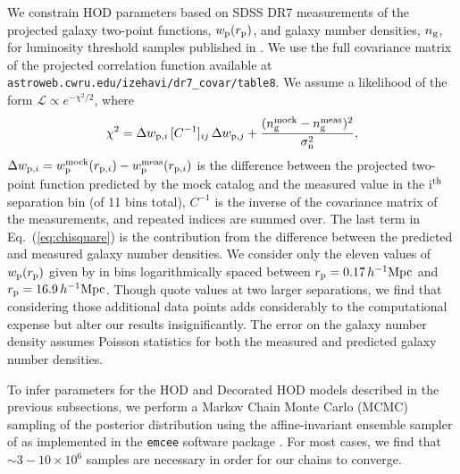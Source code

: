 \documentclass[usenatbib,usegraphicx,letterpaper]{mn2e}
\begin{document}
We constrain HOD parameters based on SDSS DR7 measurements of the projected
galaxy two-point functions, $w_{\rm p}(r_{\rm p})$, and galaxy number densities, $n_{\rm g}$,
for luminosity threshold samples published in \citet{zehavi_etal11}. We use the full covariance
matrix of the projected correlation function available at
{\tt astroweb.cwru.edu/izehavi/dr7\_covar/table8}. We assume a likelihood of the
form $\mathcal{L} \propto e^{-\chi^2/2}$, where
%
\begin{equation}
\label{eq:chisquare}
\chi^2 = \Delta w_{{\rm p},i} \, [C^{-1}]_{ij} \, \Delta w_{{\rm p},j} + \frac{(n_{\rm g}^{\rm mock} - n_{\rm g}^{\rm meas})^2}{\sigma_{\rm n}^2},
\end{equation}
%
$\Delta w_{{\rm p},i} = w_{\rm p}^{\rm mock}(r_{{\rm p},i}) - w_{\rm p}^{\rm meas}(r_{{\rm p},i})$ is the
difference between the projected two-point function predicted by the
mock catalog and the measured value in the i$^{\rm th}$ separation bin
(of 11 bins total), $C^{-1}$ is the inverse of the covariance matrix
of the measurements, and repeated indices are summed over. 
The last term in Eq.~(\ref{eq:chisquare}) is the contribution from the difference 
between the predicted and measured galaxy number densities. 
We consider only the eleven values of 
$w_{\rm p}(r_{\rm p})$ given by \citet{zehavi_etal11} in bins logarithmically spaced between 
$r_{\rm p}=0.17\, h^{-1}\mathrm{Mpc}$ and $r_{\rm p}=16.9\, h^{-1}\mathrm{Mpc}$. Though 
\citet{zehavi_etal11} quote values at two larger separations, we find that considering those additional 
data points adds considerably to the computational expense but alter our results insignificantly. 
The error on the galaxy number density assumes Poisson statistics for both the measured and 
predicted galaxy number densities.


To infer parameters for the HOD and Decorated HOD models described in the previous subsections,
we perform a Markov Chain Monte Carlo (MCMC) sampling of the posterior distribution using the
affine-invariant ensemble sampler of \citet{goodman_weare10} as implemented in the
{\tt emcee} software package \citep{foreman-mackey_etal13}. For most cases, we find that
$\sim 3-10 \times 10^{6}$ samples are necessary in order for our chains to converge.
\end{document}
